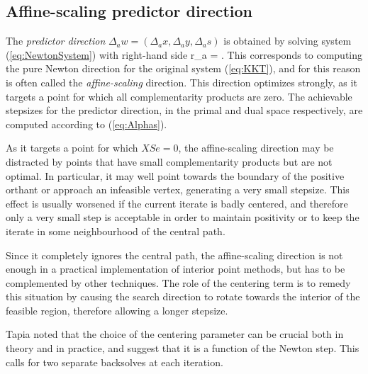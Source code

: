 %
%
\subsection{Affine-scaling predictor direction}

The {\em predictor direction} 
$\Delta_a w = (\Delta_a x, \Delta_a y, \Delta_a s)$ is obtained by solving 
system (\ref{eq:NewtonSystem}) with right-hand side 
\be  \label{eq:PredictorRhs}
 r_a = .
\ee
This corresponds to computing the pure Newton direction for the
original \KKT system (\ref{eq:KKT}), and for this reason is often
called the {\em affine-scaling} direction. This 
direction optimizes strongly, as it targets a point for which 
all complementarity products are zero. 
The achievable stepsizes for the predictor direction, 
in the primal and dual space respectively, are computed 
according to (\ref{eq:Alphas}).

As it targets a point for which $XSe = 0$, the affine-scaling direction 
may be distracted by points that have small complementarity products 
but are not optimal. 
In particular, it may well point towards the boundary of the 
positive orthant or approach an infeasible vertex, generating 
a very small stepsize. 
This effect is usually worsened if the current iterate is badly centered, 
and therefore only a very small step is acceptable in order to 
maintain positivity or to keep the iterate in some neighbourhood 
of the central path.

Since it completely ignores the central path, the affine-scaling 
direction is not enough in a practical implementation of 
interior point methods, but has to be 
complemented by other techniques.
The role of the centering term is to remedy this situation by 
causing the search direction to rotate towards the interior 
of the feasible region,
therefore allowing a longer stepsize. 

Tapia \etal \cite{TapiaZhangSaltzmanWeiser} noted that the choice of the 
centering parameter can be crucial both in theory and in practice,
and suggest that it is a function of the Newton step. 
This calls for two separate backsolves at each iteration.


